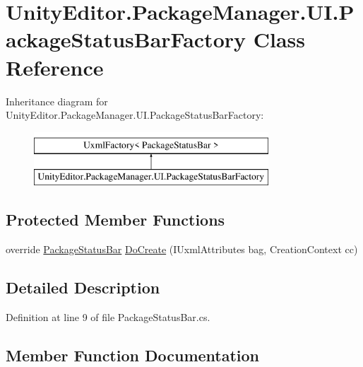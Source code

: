 \hypertarget{class_unity_editor_1_1_package_manager_1_1_u_i_1_1_package_status_bar_factory}{}\section{Unity\+Editor.\+Package\+Manager.\+U\+I.\+Package\+Status\+Bar\+Factory Class Reference}
\label{class_unity_editor_1_1_package_manager_1_1_u_i_1_1_package_status_bar_factory}
Inheritance diagram for Unity\+Editor.\+Package\+Manager.\+U\+I.\+Package\+Status\+Bar\+Factory\+:\begin{figure}[H]
\begin{center}
\leavevmode
\includegraphics[height=2.000000cm]{class_unity_editor_1_1_package_manager_1_1_u_i_1_1_package_status_bar_factory}
\end{center}
\end{figure}
\subsection*{Protected Member Functions}
\begin{DoxyCompactItemize}
\item 
override \mbox{\hyperlink{class_unity_editor_1_1_package_manager_1_1_u_i_1_1_package_status_bar}{Package\+Status\+Bar}} \mbox{\hyperlink{class_unity_editor_1_1_package_manager_1_1_u_i_1_1_package_status_bar_factory_aafa3a4cf39109549145b667d5fb5b5d8}{Do\+Create}} (I\+Uxml\+Attributes bag, Creation\+Context cc)
\end{DoxyCompactItemize}


\subsection{Detailed Description}


Definition at line 9 of file Package\+Status\+Bar.\+cs.



\subsection{Member Function Documentation}
\mbox{\label{class_unity_editor_1_1_package_manager_1_1_u_i_1_1_package_status_bar_factory_aafa3a4cf39109549145b667d5fb5b5d8}} 
